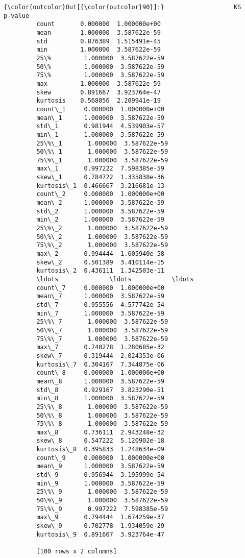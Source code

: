            \begin{Verbatim}[commandchars=\\\{\}]
{\color{outcolor}Out[{\color{outcolor}90}]:}                   KS       p-value
         count       0.000000  1.000000e+00
         mean        1.000000  3.587622e-59
         std         0.876389  1.515491e-45
         min         1.000000  3.587622e-59
         25\%         1.000000  3.587622e-59
         50\%         1.000000  3.587622e-59
         75\%         1.000000  3.587622e-59
         max         1.000000  3.587622e-59
         skew        0.891667  3.923764e-47
         kurtosis    0.568056  2.209941e-19
         count\_1     0.000000  1.000000e+00
         mean\_1      1.000000  3.587622e-59
         std\_1       0.981944  4.539903e-57
         min\_1       1.000000  3.587622e-59
         25\%\_1       1.000000  3.587622e-59
         50\%\_1       1.000000  3.587622e-59
         75\%\_1       1.000000  3.587622e-59
         max\_1       0.997222  7.598385e-59
         skew\_1      0.784722  1.335838e-36
         kurtosis\_1  0.466667  3.216681e-13
         count\_2     0.000000  1.000000e+00
         mean\_2      1.000000  3.587622e-59
         std\_2       1.000000  3.587622e-59
         min\_2       1.000000  3.587622e-59
         25\%\_2       1.000000  3.587622e-59
         50\%\_2       1.000000  3.587622e-59
         75\%\_2       1.000000  3.587622e-59
         max\_2       0.994444  1.605940e-58
         skew\_2      0.501389  3.410114e-15
         kurtosis\_2  0.436111  1.342503e-11
         \ldots              \ldots           \ldots
         count\_7     0.000000  1.000000e+00
         mean\_7      1.000000  3.587622e-59
         std\_7       0.955556  4.577742e-54
         min\_7       1.000000  3.587622e-59
         25\%\_7       1.000000  3.587622e-59
         50\%\_7       1.000000  3.587622e-59
         75\%\_7       1.000000  3.587622e-59
         max\_7       0.740278  1.280685e-32
         skew\_7      0.319444  2.024353e-06
         kurtosis\_7  0.304167  7.344875e-06
         count\_8     0.000000  1.000000e+00
         mean\_8      1.000000  3.587622e-59
         std\_8       0.929167  3.823290e-51
         min\_8       1.000000  3.587622e-59
         25\%\_8       1.000000  3.587622e-59
         50\%\_8       1.000000  3.587622e-59
         75\%\_8       1.000000  3.587622e-59
         max\_8       0.736111  2.943248e-32
         skew\_8      0.547222  5.120902e-18
         kurtosis\_8  0.395833  1.248634e-09
         count\_9     0.000000  1.000000e+00
         mean\_9      1.000000  3.587622e-59
         std\_9       0.956944  3.195999e-54
         min\_9       1.000000  3.587622e-59
         25\%\_9       1.000000  3.587622e-59
         50\%\_9       1.000000  3.587622e-59
         75\%\_9       0.997222  7.598385e-59
         max\_9       0.794444  1.674259e-37
         skew\_9      0.702778  1.934059e-29
         kurtosis\_9  0.891667  3.923764e-47

         [100 rows x 2 columns]
\end{Verbatim}

